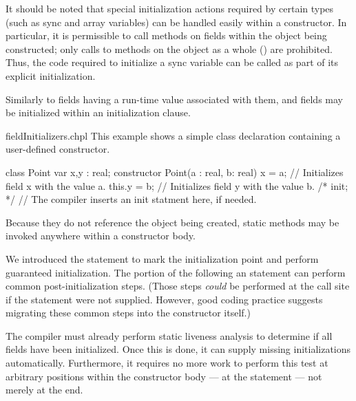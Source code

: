 It should be noted that special initialization actions required by certain types
(such as sync and array variables) can be handled easily within a constructor.
In particular, it is permissible to call
methods on fields within the object being constructed; only calls to methods on
the object as a whole () are prohibited.  Thus, the code required to
initialize a sync variable can be called as part of its explicit initialization.

Similarly to fields having a run-time value associated with them, 
and  fields may be initialized within an initialization clause.

\begin{chapelexample}{fieldInitializers.chpl}
This example shows a simple class declaration containing a user-defined constructor.
\begin{chapel}
class Point { 
  var x,y : real; 
  constructor Point(a : real, b: real)
  { x = a; 			// Initializes field x with the value a.
    this.y = b;     // Initializes field y with the value b.
    /* init; */		// The compiler inserts an init statment here, if needed.
  }
}
\end{chapel}
\end{chapelexample}
\noindent
Because they do not reference the object being created, static methods may be
invoked anywhere within a constructor body.

\begin{rationale}
We introduced the  statement to mark the initialization point and
perform guaranteed initialization.  The portion of the 
following an  statement can perform common post-initialization steps.
(Those steps \emph{could} be performed at the call site if the 
statement were not supplied.  However, good coding practice suggests migrating
these common steps into the constructor itself.)

The compiler must already perform static liveness analysis to determine if all
fields have been initialized.  Once this is done, it can supply missing
initializations automatically.  Furthermore, it requires no more work to perform
this test at arbitrary positions within the constructor body --- at
the  statement --- not merely at the end.
\end{rationale}

